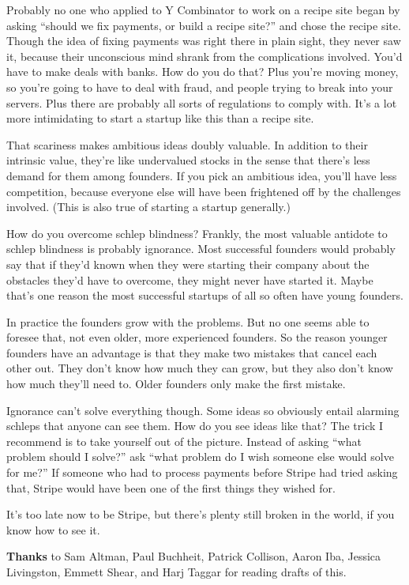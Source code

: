 Probably no one who applied to Y Combinator to work on a recipe site
began by asking ``should we fix payments, or build a recipe site?'' and
chose the recipe site. Though the idea of fixing payments was right
there in plain sight, they never saw it, because their unconscious mind
shrank from the complications involved. You'd have to make deals with
banks. How do you do that? Plus you're moving money, so you're going to
have to deal with fraud, and people trying to break into your servers.
Plus there are probably all sorts of regulations to comply with. It's a
lot more intimidating to start a startup like this than a recipe site.

That scariness makes ambitious ideas doubly valuable. In addition to
their intrinsic value, they're like undervalued stocks in the sense that
there's less demand for them among founders. If you pick an ambitious
idea, you'll have less competition, because everyone else will have been
frightened off by the challenges involved. (This is also true of
starting a startup generally.)

How do you overcome schlep blindness? Frankly, the most valuable
antidote to schlep blindness is probably ignorance. Most successful
founders would probably say that if they'd known when they were starting
their company about the obstacles they'd have to overcome, they might
never have started it. Maybe that's one reason the most successful
startups of all so often have young founders.

In practice the founders grow with the problems. But no one seems able
to foresee that, not even older, more experienced founders. So the
reason younger founders have an advantage is that they make two mistakes
that cancel each other out. They don't know how much they can grow, but
they also don't know how much they'll need to. Older founders only make
the first mistake.

Ignorance can't solve everything though. Some ideas so obviously entail
alarming schleps that anyone can see them. How do you see ideas like
that? The trick I recommend is to take yourself out of the picture.
Instead of asking ``what problem should I solve?'' ask ``what problem do
I wish someone else would solve for me?'' If someone who had to process
payments before Stripe had tried asking that, Stripe would have been one
of the first things they wished for.

It's too late now to be Stripe, but there's plenty still broken in the
world, if you know how to see it.

\textbf{Thanks} to Sam Altman, Paul Buchheit, Patrick Collison, Aaron
Iba, Jessica Livingston, Emmett Shear, and Harj Taggar for reading
drafts of this.